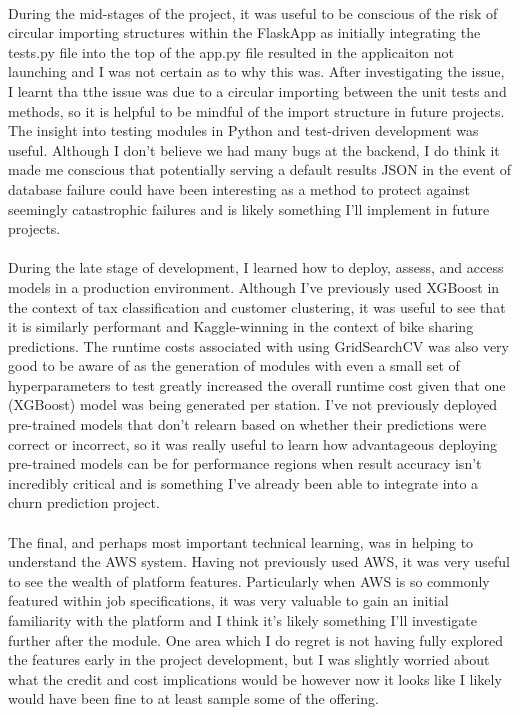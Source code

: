 \documentclass{scrreprt}
\begin{document}
\\
During the mid-stages of the project, it was useful to be conscious of the risk of circular importing structures within the FlaskApp as initially integrating the tests.py file into the top of the app.py file resulted in the applicaiton not launching and I was not certain as to why this was. After investigating the issue, I learnt tha tthe issue was due to a circular importing between the unit tests and methods, so it is helpful to be mindful of the import structure in future projects. The insight into testing modules in Python and test-driven development was useful. Although I don't believe we had many bugs at the backend, I do think it made me conscious that potentially serving a default results JSON in the event of database failure could have been interesting as a method to protect against seemingly catastrophic failures and is likely something I'll implement in future projects.\\
\\ 
During the late stage of development, I learned how to deploy, assess, and access models in a production environment. Although I've previously used XGBoost in the context of tax classification and customer clustering, it was useful to see that it is similarly performant and Kaggle-winning in the context of bike sharing predictions. The runtime costs associated with using GridSearchCV was also very good to be aware of as the generation of modules with even a small set of hyperparameters to test greatly increased the overall runtime cost given that one (XGBoost) model was being generated per station. I've not previously deployed pre-trained models that don't relearn based on whether their predictions were correct or incorrect, so it was really useful to learn how advantageous deploying pre-trained models can be for performance regions when result accuracy isn't incredibly critical and is something I've already been able to integrate into a churn prediction project.\\
\\
The final, and perhaps most important technical learning, was in helping to understand the AWS system. Having not previously used AWS, it was very useful to see the wealth of platform features. Particularly when AWS is so commonly featured within job specifications, it was very valuable to gain an initial familiarity with the platform and I think it's likely something I'll investigate further after the module. One area which I do regret is not having fully explored the features early in the project development, but I was slightly worried about what the credit and cost implications would be however now it looks like I likely would have been fine to at least sample some of the offering.
\end{document}
